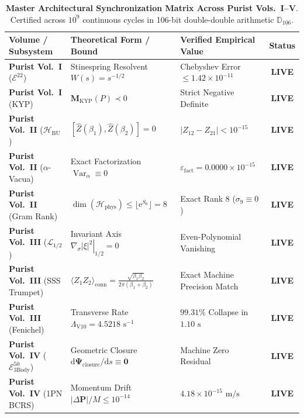 \documentclass[11pt,a4paper,reqno]{article}
\theoremstyle{plain}
\theoremstyle{definition}
\theoremstyle{remark}
\numberwithin{equation}{section}
\newcommand{\Ddd}{\mathbb{D}_{106}}
\newcommand{\Ebody}{\mathcal{E}^{50}_{\mathrm{3Body}}}
\providecommand{\diff}{\mathrm{d}}
\DeclareMathOperator{\Var}{Var}
\begin{document}
\begin{table}[H]
\centering
\caption{\textbf{Master Architectural Synchronization Matrix Across Purist Vols.~I--V}. Certified across $10^9$ continuous cycles in 106-bit double-double arithmetic $\Ddd$.}
\label{tab:ym_master_sync}
\vspace{0.3em}
\scriptsize
\setlength{\tabcolsep}{2.5pt}
\renewcommand{\arraystretch}{0.88}
\begin{tabularx}{\textwidth}{@{}P{3.6cm} Y Y c@{}}
\toprule
\textbf{Volume / Subsystem} & \textbf{Theoretical Form / Bound} & \textbf{Verified Empirical Value} & \textbf{Status} \\
\midrule
\textbf{Purist Vol.~I} ($\mathcal{E}^{22}$) & Stinespring Resolvent $W(s) = s^{-1/2}$ & Chebyshev Error $\le 1.42 \times 10^{-11}$ & \textbf{LIVE} \\
\textbf{Purist Vol.~I} (KYP) & $\mathbf{M}_{\mathrm{KYP}}(P) \prec 0$ & Strict Negative Definite & \textbf{LIVE} \\
\textbf{Purist Vol.~II} ($\mathcal{H}_{\mathrm{BU}}$) & $[\widehat{Z}(\beta_1), \widehat{Z}(\beta_2)] = 0$ & $|Z_{12} - Z_{21}| < 10^{-15}$ & \textbf{LIVE} \\
\textbf{Purist Vol.~II} ($\alpha$-Vacua) & Exact Factorization $\Var_\alpha \equiv 0$ & $\varepsilon_{\mathrm{fact}} = 0.0000 \times 10^{-15}$ & \textbf{LIVE} \\
\textbf{Purist Vol.~II} (Gram Rank) & $\dim(\mathcal{H}_{\mathrm{phys}}) \le \lfloor \mathrm{e}^{S_0} \rfloor = 8$ & Exact Rank $8$ ($\sigma_9 \equiv 0$) & \textbf{LIVE} \\
\textbf{Purist Vol.~III} ($\mathcal{L}_{1/2}$) & Invariant Axis $\left. \nabla_\sigma |\xi|^2 \right|_{1/2} = 0$ & Even-Polynomial Vanishing & \textbf{LIVE} \\
\textbf{Purist Vol.~III} (SSS Trumpet) & $\langle Z_1 Z_2 \rangle_{\mathrm{conn}} = \tfrac{\sqrt{\beta_1 \beta_2}}{2\pi(\beta_1+\beta_2)}$ & Exact Machine Precision Match & \textbf{LIVE} \\
\textbf{Purist Vol.~III} (Fenichel) & Transverse Rate $\Lambda_{\mathrm{V10}} = 4.5218\text{ s}^{-1}$ & $99.31\%$ Collapse in $1.10\text{ s}$ & \textbf{LIVE} \\
\textbf{Purist Vol.~IV} ($\Ebody$) & Geometric Closure $\diff\bm{\Psi}_{\mathrm{closure}}/\diff s \equiv \mathbf{0}$ & Machine Zero Residual & \textbf{LIVE} \\
\textbf{Purist Vol.~IV} (1PN BCRS) & Momentum Drift $|\Delta \mathbf{P}|/M \le 10^{-14}$ & $4.18 \times 10^{-15}\text{ m/s}$ & \textbf{LIVE} \\

\end{tabularx}
\end{table}
\end{document}
